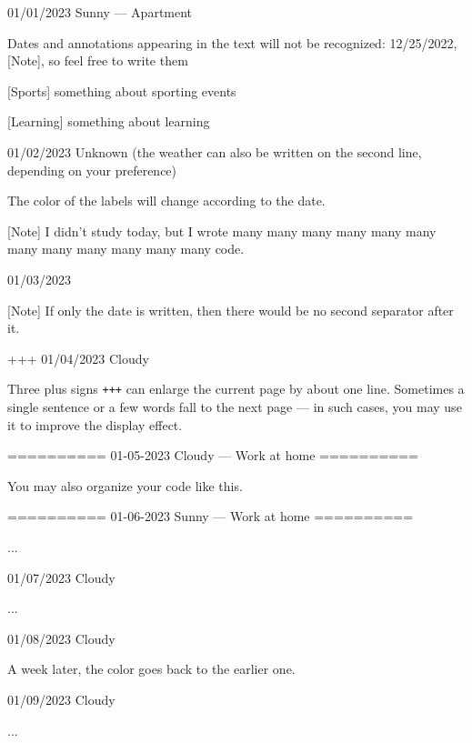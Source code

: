\documentclass[11pt, paperstyle=light yellow, color entry, month-day-year]{jwjournal}
\begin{document}
01/01/2023 Sunny --- Apartment

  Dates and annotations appearing in the text will not be recognized: 12/25/2022, [Note], so feel free to write them

  [Sports] something about sporting events

  [Learning] something about learning



01/02/2023
Unknown (the weather can also be written on the second line, depending on your preference)

  The color of the labels will change according to the date.

  [Note] I didn't study today, but I wrote many many many many many many many many many many many many code.



01/03/2023

  [Note] If only the date is written, then there would be no second separator after it.


+++
01/04/2023  Cloudy

  Three plus signs \texttt{+++} can enlarge the current page by about one line. Sometimes a single sentence or a few words fall to the next page --- in such cases, you may use it to improve the display effect.



==========
01-05-2023    Cloudy        --- Work at home
==========

You may also organize your code like this.


==========
01-06-2023    Sunny         --- Work at home
==========

...



01/07/2023  Cloudy

  ...



01/08/2023  Cloudy

  A week later, the color goes back to the earlier one.



01/09/2023  Cloudy

  ...
\end{document}
